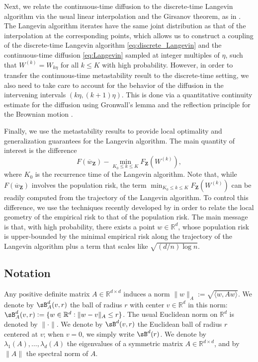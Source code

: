 \documentclass[final,12pt]{colt2018}
\numberwithin{equation}{section}
\numberwithin{equation}{section}
\def\Reals{\mathbb{R}}
\def\deq{:=}
\def\bd#1{\mathbf{#1}}
\def\bZ{\bd{Z}}
\def\barw{\overline{w}}
\def\ave#1{\langle #1 \rangle}
\begin{document}
Next, we relate the continuous-time diffusion to the discrete-time Langevin algorithm via the usual linear interpolation and the Girsanov theorem, as in \cite*{rrt_colt17}.  The Langevin algorithm iterates have the same joint distribution as that of the interpolation at the corresponding points, which allows us to construct a coupling of the discrete-time Langevin algorithm \eqref{eq:discrete_Langevin} and the continuous-time diffusion \eqref{eq:Langevin} sampled at integer multiples of $\eta$, such that $W^{(k)}=W_{k\eta}$ for all $k \le K$ with high probability. However, in order to transfer the continuous-time metastability result to the discrete-time setting, we also need to take care to account for the behavior of the diffusion in the intervening intervals $(k \eta, (k+1) \eta)$. This is done via a quantitative continuity estimate for the diffusion using Gronwall's lemma and the reflection principle for the Brownian motion \citep{morters2010brownian}. 

Finally, we use the metastability results to provide local optimality and generalization guarantees for the Langevin algorithm. The main quantity of interest is the difference 
$$
F(\barw_\bZ) - \min_{K_0 \le k \le K} F_\bZ(W^{(k)}),
$$
where $K_0$ is the recurrence time of the Langevin algorithm. Note that, while $F(\barw_\bZ)$ involves the population risk, the term $\min_{K_0 \le k \le K} F_\bZ(W^{(k)})$ can be readily computed from the trajectory of the Langevin algorithm. To control this difference, we use the techniques recently developed by \cite*{mei2016landscape} in order to relate the local geometry of the empirical risk to that of the population risk. The main message  is that, with high probability, there exists a point $w \in \Reals^d$,  whose population risk is upper-bounded by the minimal empirical risk along the trajectory of the Langevin algorithm plus a term that scales like $\sqrt{(d/n)\log n}$.




\subsection{Notation}

\sloppypar Any positive definite matrix $A \in \Reals^{d \times d}$ induces a norm $\| w \|_A \deq \sqrt{\ave{w,Aw}}$. We denote by $\sB^d_A(v,r)$ the ball of radius $r$ with center $v \in \Reals^d$ in this norm: $\sB^d_A(v,r) \deq \{ w \in \Reals^d : \| w - v \|_A \le r \}$. The usual Euclidean norm on $\Reals^d$ is denoted by $\|\cdot\|$. We denote by $\sB^d(v,r)$ the Euclidean ball of radius $r$ centered at $v$; when $v=0$, we simply write $\sB^d(r)$. We denote by $\lambda_1(A),\ldots,\lambda_d(A)$ the eigenvalues of a symmetric matrix $A \in \Reals^{d\times d}$, and by $\|A\|$ the spectral norm of $A$.
\end{document}

